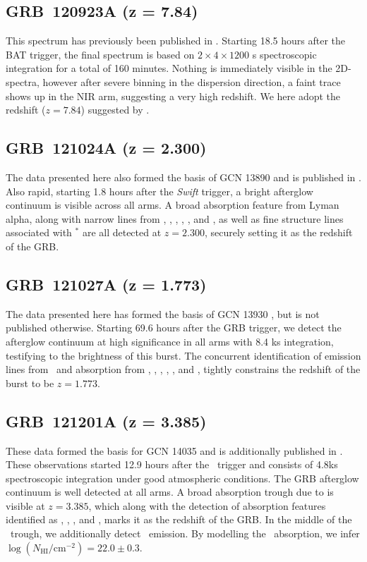 \documentclass{aa}    %
\begin{document}
\subsection{GRB~120923A (z = 7.84)} \label{120923}

This spectrum has previously been published in \citet{Tanvir2017a}. Starting
18.5 hours after the BAT trigger, the final spectrum is based on $2 \times 4
\times 1200$ s spectroscopic integration for a total of 160 minutes. Nothing is
immediately visible in the 2D-spectra, however after severe binning in the
dispersion direction, a faint trace shows up in the NIR arm, suggesting a very
high redshift. We here adopt the redshift ($z = 7.84$) suggested by
\citet{Tanvir2017a}.

\subsection{GRB~121024A (z = 2.300)} \label{121024}

The data presented here also formed the basis of GCN 13890 \citep{GCN13890} and
is published in \citet{Friis2015}. Also rapid, starting 1.8 hours after the
\textit{Swift} trigger, a bright afterglow continuum is visible across all arms.
A broad absorption feature from Lyman alpha, along with narrow lines from \civ,
\SIii, \SIiv, \feii, \sii, and \alii, as well as fine structure lines associated
with \SIii$^*$ are all detected at $z = 2.300$, securely setting it as the
redshift of the GRB.

\subsection{GRB~121027A (z = 1.773)} \label{121027}

The data presented here has formed the basis of GCN 13930 \citep{GCN13930}, but
is not published otherwise. Starting 69.6 hours after the GRB trigger, we detect
the afterglow continuum at high significance in all arms with 8.4 ks
integration, testifying to the brightness of this burst. The concurrent
identification of emission lines from \oiii~and absorption from \civ, \alii,
\aliii, \mgi, \mgii, and \feii, tightly constrains the redshift of the burst to
be $z = 1.773$.

\subsection{GRB~121201A (z = 3.385)} \label{121201}

These data formed the basis for GCN 14035 \citep{GCN14035} and is additionally
published in \citet{Kruhler2015}. These observations started 12.9 hours after
the \swift~trigger and consists of 4.8ks spectroscopic integration under good
atmospheric conditions. The GRB afterglow continuum is well detected at all
arms. A broad absorption trough due to \lya is visible at $z = 3.385$, which
along with the detection of absorption features identified as \SIiv, \civ,
\alii, and \aliii, marks it as the redshift of the GRB. In the middle of the
\lya~trough, we additionally detect \lya~emission. By modelling the
\lya~absorption, we infer $\log (N_{\mathrm{HI}}/\mathrm{cm}^{-2}) = 22.0 \pm
0.3$.
\end{document}
